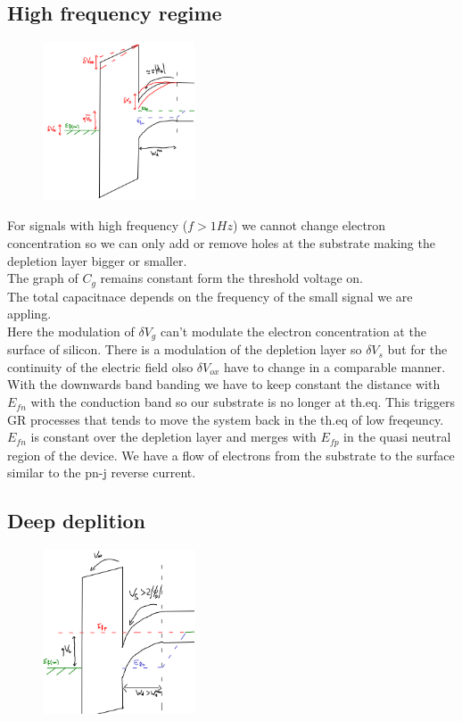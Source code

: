 \subsection{High frequency regime}
\begin{figure}
\includegraphics[width=0.4\textwidth]{hfbd.png}
\end{figure}
For signals with high frequency ($f>1Hz$) we cannot change electron concentration so we can only add or remove holes at the substrate making the depletion layer bigger or smaller.\\ 
The graph of $C_g$ remains constant form the threshold voltage on.\\
The total capacitnace depends on the frequency of the small signal we are appling.\\
Here the modulation of $\delta V_g$ can't modulate the electron concentration at the surface of silicon. There is a modulation of the depletion layer so $\delta V_s$ but for the continuity of the electric field olso $\delta V_{ox}$ have to change in a comparable manner. With the downwards band banding we have to keep constant the distance with $E_{fn}$ with the conduction band so our substrate is no longer at th.eq. This triggers GR processes that tends to move the system back in the th.eq of low freqeuncy.
$E_{fn}$ is constant over the depletion layer and merges with $E_{fp}$ in the quasi neutral region of the device. We have a flow of electrons from the substrate to the surface similar to the pn-j reverse current.\\

\subsection{Deep deplition}

\begin{figure}
\includegraphics[width=0.4\textwidth]{ddcond.png}
\end{figure}

